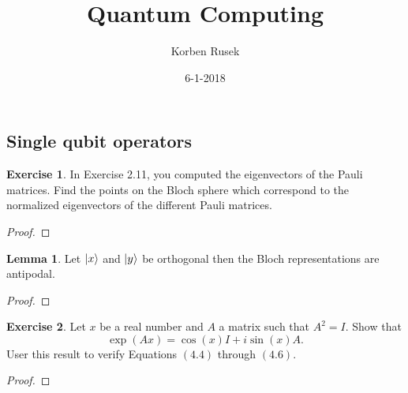 \documentclass{article}
\author{Korben Rusek}
\title{Quantum Computing}
\date{6-1-2018}
\begin{document}
  \maketitle
  \newcommand{\gindex}[2]{|#1\!:\!#2|}
  \newcommand{\lcm}{\textrm{lcm}}
  \newcommand{\irr}{\textrm{irr}}
  \newcommand{\sylp}{$Syl_{p}$}
  \newcommand{\phnt}[1]{$\phantom{1}^{#1}$}
  \newcommand{\gen}[1]{\langle#1\rangle}
  \newcommand{\BN}{\mathbb{N}}
  \newcommand{\BZ}{\mathbb{Z}}
  \newcommand{\BQ}{\mathbb{Q}}
  \newcommand{\BR}{\mathbb{R}}
  \newcommand{\BC}{\mathbb{C}}
  \newcommand{\BF}{\mathbb{F}}
  \newcommand{\CF}{\mathcal{F}}
  \newcommand{\CQ}{\mathcal{Q}}
  \newcommand{\fa}{\mathfrak{a}}
  \newcommand{\fb}{\mathfrak{b}}
  \newcommand{\fp}{\mathfrak{p}}
  \newcommand{\fq}{\mathfrak{q}}
  \newcommand{\fm}{\mathfrak{m}}
  \newcommand{\FN}{\mathfrak{N}}
  \newcommand{\FR}{\mathfrak{R}}
  \newcommand{\set}[1]{\{#1\}}
  \newcommand{\trv}{\set{1}}
  \newcommand{\Aut}{\mathrm{Aut}}
  \newcommand{\End}{\mathrm{End}}
  \newcommand{\Ker}{\mathrm{Ker}}
  \newcommand{\chr}{\mathrm{char}}

  \theoremstyle{definition}
  \newtheorem{theorem}{Theorem}[section]
  \newtheorem{definition}[theorem]{Definition}
  \newtheorem{lemma}[theorem]{Lemma}
  \newtheorem{exercise}{Exercise}[section]

  \setcounter{section}{4}
  \setcounter{subsection}{1}

\subsection{Single qubit operators}

\begin{exercise}
  In Exercise 2.11, you computed the eigenvectors of the Pauli matrices. Find the points on the Bloch sphere which correspond to the normalized eigenvectors of the different Pauli matrices.
  \begin{proof}

  \end{proof}
\end{exercise}

\begin{lemma}
  Let $\ket{x}$ and $\ket{y}$ be orthogonal then the Bloch representations are antipodal.
  \begin{proof}

  \end{proof}
\end{lemma}

\begin{exercise}
  Let $x$ be a real number and $A$ a matrix such that $A^2=I$. Show that
  \[\exp(Ax)=\cos(x)I+i\sin(x)A.\]
  User this result to verify Equations $(4.4)$ through $(4.6)$.
  \begin{proof}

  \end{proof}
\end{exercise}
\end{document}
